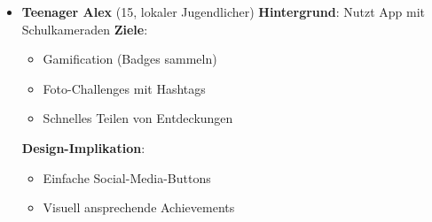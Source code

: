 \documentclass[10pt]{article}
\begin{document}
\begin{itemize}
		\item \textbf{Teenager Alex} (15, lokaler Jugendlicher)
		\subitem \textbf{Hintergrund}: Nutzt App mit Schulkameraden
		\subitem \textbf{Ziele}: 
		\begin{itemize}
			\item Gamification (Badges sammeln)
			\item Foto-Challenges mit Hashtags
			\item Schnelles Teilen von Entdeckungen
		\end{itemize}
		\subitem \textbf{Design-Implikation}: 
		\begin{itemize}
			\item Einfache Social-Media-Buttons
			\item Visuell ansprechende Achievements
		\end{itemize}
	\end{itemize}
\end{document}
